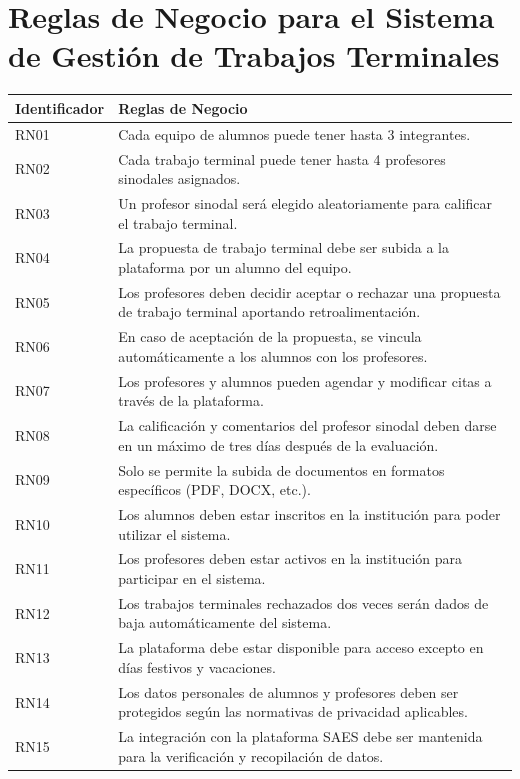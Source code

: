 \section*{Reglas de Negocio para el Sistema de Gestión de Trabajos Terminales}

\begin{tabular}{ | m{3cm} | m{12cm} | } 
\hline
\textbf{Identificador} & \textbf{Reglas de Negocio} \\
\hline
RN01 & Cada equipo de alumnos puede tener hasta 3 integrantes. \\
\hline
RN02 & Cada trabajo terminal puede tener hasta 4 profesores sinodales asignados. \\
\hline
RN03 & Un profesor sinodal será elegido aleatoriamente para calificar el trabajo terminal. \\
\hline
RN04 & La propuesta de trabajo terminal debe ser subida a la plataforma por un alumno del equipo. \\
\hline
RN05 & Los profesores deben decidir aceptar o rechazar una propuesta de trabajo terminal aportando retroalimentación. \\
\hline
RN06 & En caso de aceptación de la propuesta, se vincula automáticamente a los alumnos con los profesores. \\
\hline
RN07 & Los profesores y alumnos pueden agendar y modificar citas a través de la plataforma. \\
\hline
RN08 & La calificación y comentarios del profesor sinodal deben darse en un máximo de tres días después de la evaluación. \\
\hline
RN09 & Solo se permite la subida de documentos en formatos específicos (PDF, DOCX, etc.). \\
\hline
RN10 & Los alumnos deben estar inscritos en la institución para poder utilizar el sistema. \\
\hline
RN11 & Los profesores deben estar activos en la institución para participar en el sistema. \\
\hline
RN12 & Los trabajos terminales rechazados dos veces serán dados de baja automáticamente del sistema. \\
\hline
RN13 & La plataforma debe estar disponible para acceso excepto en días festivos y vacaciones. \\
\hline
RN14 & Los datos personales de alumnos y profesores deben ser protegidos según las normativas de privacidad aplicables. \\
\hline
RN15 & La integración con la plataforma SAES debe ser mantenida para la verificación y recopilación de datos. \\
\hline
\end{tabular}


